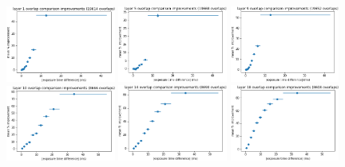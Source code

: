 \documentclass[letterpaper,11pt]{article}
\begin{document}
\begin{figure}[!ht]
\centering
\includegraphics[width=0.32\textwidth]{images/results/improvements_by_layer_vectra/layer_1_improvements_vectra}
\includegraphics[width=0.32\textwidth]{images/results/improvements_by_layer_vectra/layer_5_improvements_vectra}
\includegraphics[width=0.32\textwidth]{images/results/improvements_by_layer_vectra/layer_9_improvements_vectra}
\includegraphics[width=0.32\textwidth]{images/results/improvements_by_layer_vectra/layer_10_improvements_vectra}
\includegraphics[width=0.32\textwidth]{images/results/improvements_by_layer_vectra/layer_14_improvements_vectra}
\includegraphics[width=0.32\textwidth]{images/results/improvements_by_layer_vectra/layer_18_improvements_vectra}

\end{figure}
\end{document}
